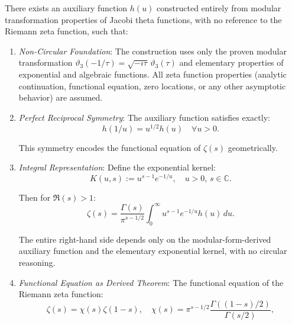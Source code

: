 \begin{theorem}
\label{thm:nonCircularAuxiliaryFunction}

There exists an auxiliary function $h(u)$ constructed entirely from modular transformation properties of Jacobi theta functions, with no reference to the Riemann zeta function, such that:

\begin{enumerate}

\item[\textbf{(NC1)}] \emph{Non-Circular Foundation}: The construction uses only the proven modular transformation $\vartheta_3(-1/\tau) = \sqrt{-i\tau}\, \vartheta_3(\tau)$ and elementary properties of exponential and algebraic functions. All zeta function properties (analytic continuation, functional equation, zero locations, or any other asymptotic behavior) are assumed.

\item[\textbf{(NC2)}] \emph{Perfect Reciprocal Symmetry}: The auxiliary function satisfies exactly:
\begin{equation}
h(1/u) = u^{1/2} h(u) \quad \forall u > 0.
\end{equation}

This symmetry encodes the functional equation of $\zeta(s)$ geometrically.

\item[\textbf{(NC3)}] \emph{Integral Representation}: Define the exponential kernel:
\begin{equation}
K(u,s) := u^{s-1} e^{-1/u}, \quad u > 0, \, s \in \mathbb{C}.
\end{equation}

Then for $\Re(s) > 1$:
\begin{equation}
\zeta(s) = \frac{\Gamma(s)}{\pi^{s-1/2}} \int_0^{\infty} u^{s-1} e^{-1/u} h(u) \, du.
\end{equation}

The entire right-hand side depends only on the modular-form-derived auxiliary function and the elementary exponential kernel, with no circular reasoning.

\item[\textbf{(NC4)}] \emph{Functional Equation as Derived Theorem}: The functional equation of the Riemann zeta function:
\begin{equation}
\zeta(s) = \chi(s) \zeta(1-s), \quad \chi(s) = \pi^{s-1/2}\frac{\Gamma((1-s)/2)}{\Gamma(s/2)},
\end{equation}


\end{enumerate}
\end{theorem}

